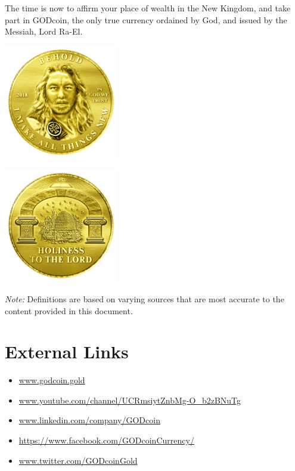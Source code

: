 \documentclass[12pt,a4paper]{article}
\begin{document}
  The time is now to affirm your place of wealth in the New Kingdom, and take
  part in GODcoin, the only true currency ordained by God, and issued by the
  Messiah, Lord Ra-El.\\

  \begin{minipage}{.5\textwidth}
    \centering
    \includegraphics[width=50mm]{coin-front.png}\\
  \end{minipage}%
  \begin{minipage}{.5\textwidth}
    \centering
    \includegraphics[width=50mm]{coin-back.png}\\
  \end{minipage}

  \newpage
  \printnoidxglossaries{}

  \textit{Note:} Definitions are based on varying sources that are most accurate
  to the content provided in this document.
  \newpage

  \section*{External Links}
  \begin{itemize}
    \item{\url{www.godcoin.gold}}
    \item{\url{www.youtube.com/channel/UCRmsiytZnbMg-O_b2zBNuTg}}
    \item{\url{www.linkedin.com/company/GODcoin}}
    \item{\url{https://www.facebook.com/GODcoinCurrency/}}
    \item{\url{www.twitter.com/GODcoinGold}}
  \end{itemize}
\end{document}
